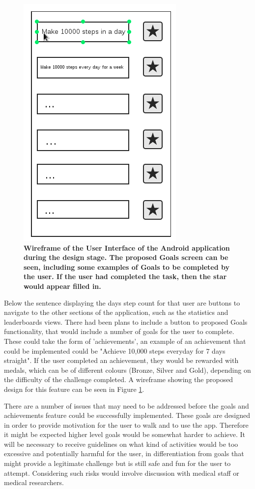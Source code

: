 \documentclass{l4proj}
\begin{document}
\begin{figure}[ht!]
\centering
\includegraphics[scale=0.7]{images/diagrams/goalswireframe.png}
\caption{\textbf{Wireframe of the User Interface of the Android application during the design stage. The proposed Goals screen can be seen, including some examples of Goals to be completed by the user. If the user had completed the task, then the star would appear filled in.}}
\label{design:goalswireframe}
\end{figure}

Below the sentence displaying the days step count for that user are buttons to navigate to the other sections of the application, such as the statistics and leaderboards views. There had been plans to include a button to proposed Goals functionality, that would include a number of goals for the user to complete. These could take the form of 'achievements', an example of an achievement that could be implemented could be "Achieve 10,000 steps everyday for 7 days straight". If the user completed an achievement, they would be rewarded with medals, which can be of different colours (Bronze, Silver and Gold), depending on the difficulty of the challenge completed. A wireframe showing the proposed design for this feature can be seen in Figure \ref{design:goalswireframe}.

There are a number of issues that may need to be addressed before the goals and achievements feature could be successfully implemented. These goals are designed in order to provide motivation for the user to walk and to use the app. Therefore it might be expected higher level goals would be somewhat harder to achieve. It will be necessary to receive guidelines on what kind of activities would be too excessive and potentially harmful for the user, in differentiation from goals that might provide a legitimate challenge but is still safe and fun for the user to attempt.  Considering such risks would involve discussion with medical staff or medical researchers.
\end{document}

